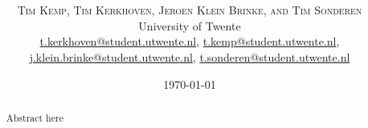 \documentclass[twoside]{article}
\title{\vspace{-15mm}\fontsize{24pt}{10pt}\selectfont\textbf{\articletitle}} %
\author{
\large
\textsc{Tim Kemp, Tim Kerkhoven, Jeroen Klein Brinke, and Tim Sonderen}\\[2mm] %
\normalsize University of Twente \\ %
\normalsize \href{mailto:t.kerkhoven@student.utwente.nl}{t.kerkhoven@student.utwente.nl}, 
\href{mailto:t.kemp@student.utwente.nl}{t.kemp@student.utwente.nl},\\ \normalsize
\href{mailto:j.klein.brinke@student.utwente.nl}{j.klein.brinke@student.utwente.nl}, \href{mailto:t.sonderen@student.utwente.nl}{t.sonderen@student.utwente.nl}%
}
\date{\today}
\begin{document}
\thispagestyle{empty}
\maketitle %


\begin{abstract}

\noindent Abstract here

\end{abstract}

\end{document}
